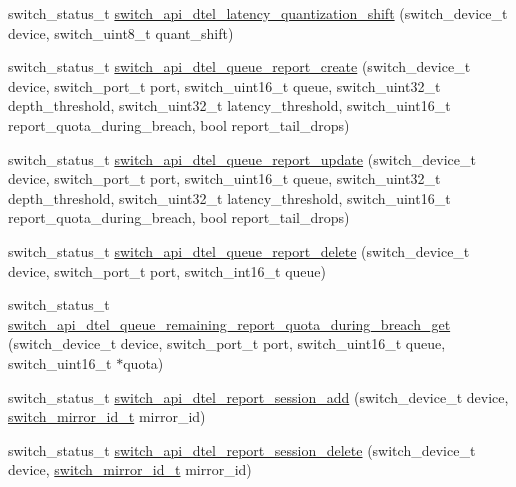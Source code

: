 \begin{DoxyCompactItemize}
\item 
switch\+\_\+status\+\_\+t \hyperlink{group__DTel_gab67fdd50397d7da569d087a2f36947a2}{switch\+\_\+api\+\_\+dtel\+\_\+latency\+\_\+quantization\+\_\+shift} (switch\+\_\+device\+\_\+t device, switch\+\_\+uint8\+\_\+t quant\+\_\+shift)
\item 
switch\+\_\+status\+\_\+t \hyperlink{group__DTel_gaea3f067680a5e2eaa864a7f3855993b1}{switch\+\_\+api\+\_\+dtel\+\_\+queue\+\_\+report\+\_\+create} (switch\+\_\+device\+\_\+t device, switch\+\_\+port\+\_\+t port, switch\+\_\+uint16\+\_\+t queue, switch\+\_\+uint32\+\_\+t depth\+\_\+threshold, switch\+\_\+uint32\+\_\+t latency\+\_\+threshold, switch\+\_\+uint16\+\_\+t report\+\_\+quota\+\_\+during\+\_\+breach, bool report\+\_\+tail\+\_\+drops)
\item 
switch\+\_\+status\+\_\+t \hyperlink{group__DTel_ga60f7d20cfc0d4141e5f9b93df6998883}{switch\+\_\+api\+\_\+dtel\+\_\+queue\+\_\+report\+\_\+update} (switch\+\_\+device\+\_\+t device, switch\+\_\+port\+\_\+t port, switch\+\_\+uint16\+\_\+t queue, switch\+\_\+uint32\+\_\+t depth\+\_\+threshold, switch\+\_\+uint32\+\_\+t latency\+\_\+threshold, switch\+\_\+uint16\+\_\+t report\+\_\+quota\+\_\+during\+\_\+breach, bool report\+\_\+tail\+\_\+drops)
\item 
switch\+\_\+status\+\_\+t \hyperlink{group__DTel_gae703dbd21d7d4655873ddc275d19fc4b}{switch\+\_\+api\+\_\+dtel\+\_\+queue\+\_\+report\+\_\+delete} (switch\+\_\+device\+\_\+t device, switch\+\_\+port\+\_\+t port, switch\+\_\+int16\+\_\+t queue)
\item 
switch\+\_\+status\+\_\+t \hyperlink{group__DTel_ga21909ab2c423513c01daf3047975a24e}{switch\+\_\+api\+\_\+dtel\+\_\+queue\+\_\+remaining\+\_\+report\+\_\+quota\+\_\+during\+\_\+breach\+\_\+get} (switch\+\_\+device\+\_\+t device, switch\+\_\+port\+\_\+t port, switch\+\_\+uint16\+\_\+t queue, switch\+\_\+uint16\+\_\+t $\ast$quota)
\item 
switch\+\_\+status\+\_\+t \hyperlink{group__DTel_ga8a40e59037f4fb16f60680f7b93f3514}{switch\+\_\+api\+\_\+dtel\+\_\+report\+\_\+session\+\_\+add} (switch\+\_\+device\+\_\+t device, \hyperlink{group__Mirror_gaf5ec4a656bd46aede10f08c5dfd3a09c}{switch\+\_\+mirror\+\_\+id\+\_\+t} mirror\+\_\+id)
\item 
switch\+\_\+status\+\_\+t \hyperlink{group__DTel_ga0840716c1d09971cbbfe7e9607710154}{switch\+\_\+api\+\_\+dtel\+\_\+report\+\_\+session\+\_\+delete} (switch\+\_\+device\+\_\+t device, \hyperlink{group__Mirror_gaf5ec4a656bd46aede10f08c5dfd3a09c}{switch\+\_\+mirror\+\_\+id\+\_\+t} mirror\+\_\+id)

\end{DoxyCompactItemize}
